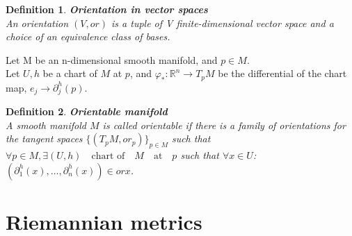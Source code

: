 \documentclass[11pt]{book} %
\newtheorem{definition}{Definition}[section]
\begin{document}
\begin{definition}{\textbf{Orientation in vector spaces}} \\
    An orientation $(V, or)$ is a tuple of V finite-dimensional vector space and a choice of an equivalence class of bases. \\
\end{definition}

Let M be an n-dimensional smooth manifold, and $p \in M$. \\
Let \(U, h\) be a chart of \(M\) at \(p\), and $\varphi_* : \mathbb{R}^n \to T_pM$ be the differential of the chart map, $e_j \to \partial_j^{h}(p)$. \\

\begin{definition}{\textbf{Orientable manifold}} \\
    A smooth manifold \( M \) is called orientable if there is a family of orientations for the tangent spaces $\{(T_pM, or_p)\}_{p \in M}$ such that
    $\forall p \in M, \exists (U,h) \quad \text{chart of} \quad M \quad \text{at} \quad p$ such that $\forall x \in U$: $(\partial_1^h(x), \ldots, \partial_n^h(x)) \in or x$.
\end{definition}





\section{Riemannian metrics}
\end{document}
